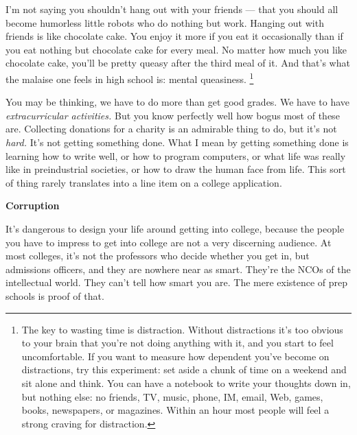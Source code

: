 \documentclass[12pt]{book}
\begin{document}
I'm not saying you shouldn't hang out with your friends --- that you
should all become humorless little robots who do nothing but work.
Hanging out with friends is like chocolate cake. You enjoy it more if
you eat it occasionally than if you eat nothing but chocolate cake for
every meal. No matter how much you like chocolate cake, you'll be pretty
queasy after the third meal of it. And that's what the malaise one feels
in high school is: mental queasiness. \footnote{The key to wasting time is distraction. Without distractions
it's too obvious to your brain that you're not doing anything with it,
and you start to feel uncomfortable. If you want to measure how
dependent you've become on distractions, try this experiment: set aside
a chunk of time on a weekend and sit alone and think. You can have a
notebook to write your thoughts down in, but nothing else: no friends,
TV, music, phone, IM, email, Web, games, books, newspapers, or
magazines. Within an hour most people will feel a strong craving for
distraction.}

You may be thinking, we have to do more than get good grades. We have to
have \emph{extracurricular activities.} But you know perfectly well how
bogus most of these are. Collecting donations for a charity is an
admirable thing to do, but it's not \emph{hard.} It's not getting
something done. What I mean by getting something done is learning how to
write well, or how to program computers, or what life was really like in
preindustrial societies, or how to draw the human face from life. This
sort of thing rarely translates into a line item on a college
application.

\textbf{Corruption}

It's dangerous to design your life around getting into college, because
the people you have to impress to get into college are not a very
discerning audience. At most colleges, it's not the professors who
decide whether you get in, but admissions officers, and they are nowhere
near as smart. They're the NCOs of the intellectual world. They can't
tell how smart you are. The mere existence of prep schools is proof of
that.
\end{document}
